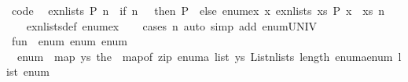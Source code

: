 \begin{isabellebody}
\isanewline
{}\isamarkupfalse%
\ {\isacharbrackleft}{\kern0pt}code{\isacharbrackright}{\kern0pt}{\isacharcolon}{\kern0pt}\isanewline
\ \ {\isachardoublequoteopen}ex{\isacharunderscore}{\kern0pt}n{\isacharunderscore}{\kern0pt}lists\ P\ n\ {\isasymlongleftrightarrow}\ {\isacharparenleft}{\kern0pt}if\ n\ {\isacharequal}{\kern0pt}\ {}\ then\ P\ {\isacharbrackleft}{\kern0pt}{\isacharbrackright}{\kern0pt}\ else\ enum{\isacharunderscore}{\kern0pt}ex\ {\isacharparenleft}{\kern0pt}{\isacharpercent}{\kern0pt}x{\isachardot}{\kern0pt}\ ex{\isacharunderscore}{\kern0pt}n{\isacharunderscore}{\kern0pt}lists\ {\isacharparenleft}{\kern0pt}{\isacharpercent}{\kern0pt}xs{\isachardot}{\kern0pt}\ P\ {\isacharparenleft}{\kern0pt}x\ {\isacharhash}{\kern0pt}\ xs{\isacharparenright}{\kern0pt}{\isacharparenright}{\kern0pt}\ {\isacharparenleft}{\kern0pt}n\ {\isacharminus}{\kern0pt}\ {}{\isacharparenright}{\kern0pt}{\isacharparenright}{\kern0pt}{\isacharparenright}{\kern0pt}{\isachardoublequoteclose}\isanewline
%
\isadelimproof
\ \ %
\endisadelimproof
%
\isatagproof
{}\isamarkupfalse%
\ ex{\isacharunderscore}{\kern0pt}n{\isacharunderscore}{\kern0pt}lists{\isacharunderscore}{\kern0pt}def\ enum{\isacharunderscore}{\kern0pt}ex\isanewline
\ \ \isamarkupfalse%
\ {\isacharparenleft}{\kern0pt}cases\ n{\isacharparenright}{\kern0pt}\ {\isacharparenleft}{\kern0pt}auto\ simp\ add{\isacharcolon}{\kern0pt}\ enum{\isacharunderscore}{\kern0pt}UNIV{\isacharparenright}{\kern0pt}%
\endisatagproof
{\isafoldproof}%
%
\isadelimproof
\isanewline
%
\endisadelimproof
\isanewline
{}\isamarkupfalse%
\ {\isachardoublequoteopen}fun{\isachardoublequoteclose}\ {\isacharcolon}{\kern0pt}{\isacharcolon}{\kern0pt}\ {\isacharparenleft}{\kern0pt}enum{\isacharcomma}{\kern0pt}\ enum{\isacharparenright}{\kern0pt}\ enum\isanewline
{}\isanewline
\isanewline
{}\isamarkupfalse%
\isanewline
\ \ {\isachardoublequoteopen}enum\ {\isacharequal}{\kern0pt}\ map\ {\isacharparenleft}{\kern0pt}{\isasymlambda}ys{\isachardot}{\kern0pt}\ the\ {\isasymcirc}\ map{\isacharunderscore}{\kern0pt}of\ {\isacharparenleft}{\kern0pt}zip\ {\isacharparenleft}{\kern0pt}enum{\isacharcolon}{\kern0pt}{\isacharcolon}{\kern0pt}{\isacharprime}{\kern0pt}a\ list{\isacharparenright}{\kern0pt}\ ys{\isacharparenright}{\kern0pt}{\isacharparenright}{\kern0pt}\ {\isacharparenleft}{\kern0pt}List{\isachardot}{\kern0pt}n{\isacharunderscore}{\kern0pt}lists\ {\isacharparenleft}{\kern0pt}length\ {\isacharparenleft}{\kern0pt}enum{\isacharcolon}{\kern0pt}{\isacharcolon}{\kern0pt}{\isacharprime}{\kern0pt}a{\isacharcolon}{\kern0pt}{\isacharcolon}{\kern0pt}enum\ list{\isacharparenright}{\kern0pt}{\isacharparenright}{\kern0pt}\ enum{\isacharparenright}{\kern0pt}{\isachardoublequoteclose}\isanewline

\end{isabellebody}

